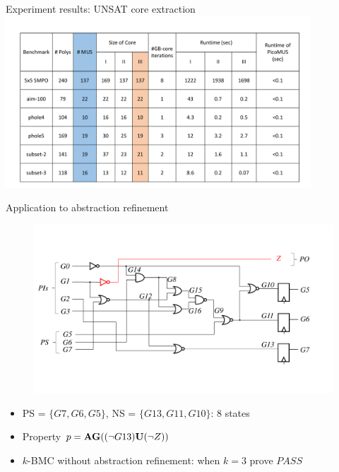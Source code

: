 \documentclass[xcolor=dvipsnames]{beamer}
\newcommand{\bi}{\begin{itemize}}
\newcommand{\ei}{\end{itemize}}
\begin{document}
\begin{frame}{\large{Experiment results: UNSAT core extraction}}
\\
\includegraphics[width=4.5in]{./table_cp2016.pdf}

\end{frame}
\begin{frame}{\large{Application to abstraction refinement}}
\vspace{-0.1in}
\begin{figure}
\centering
\includegraphics[scale=0.35]{../newfig/s27.pdf}
\end{figure}
\vspace{-0.3in}
\bi
\item PS = $\{G7,G6,G5\}$, NS = $\{G13,G11,G10\}$: 8 states
\item Property $p = {\bf AG}( (\neg G13) {\bf U} (\neg Z) )$
\item $k$-BMC without abstraction refinement: when $k=3$ prove $PASS$
\ei
\end{frame}
\end{document}
